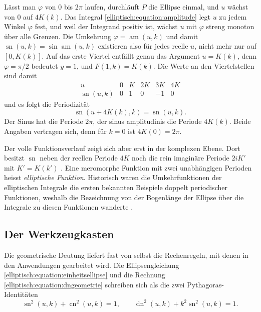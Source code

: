 Lässt man $\varphi$ von $0$ bis $2\pi$ laufen, durchläuft $P$ die
Ellipse einmal, und $u$ wächst von $0$ auf $4K(k)$.
Das Integral \eqref{elliptisch:equation:amplitude} legt $u$ zu
jedem Winkel $\varphi$ fest, und weil der Integrand positiv ist,
wächst $u$ mit $\varphi$ streng monoton über alle Grenzen.
Die Umkehrung $\varphi = \operatorname{am}(u,k)$ und damit
$\operatorname{sn}(u,k) = \sin\operatorname{am}(u,k)$ existieren
also für jedes reelle $u$, nicht mehr nur auf $[0, K(k)]$.
Auf das erste Viertel entfällt genau das Argument $u = K(k)$,
denn $\varphi = \pi/2$ bedeutet $y = 1$, und $F(1,k) = K(k)$.
Die Werte an den Viertelstellen sind damit
\begin{equation}
\begin{array}{c|ccccc}
u & 0 & K & 2K & 3K & 4K\\
\hline
\operatorname{sn}(u,k) & 0 & 1 & 0 & -1 & 0
\end{array}
\label{elliptisch:equation:snviertel}
\end{equation}
und es folgt die Periodizität
\begin{equation}
\operatorname{sn}(u + 4K(k), k)
=
\operatorname{sn}(u,k).
\label{elliptisch:equation:periode}
\end{equation}
Der Sinus hat die Periode $2\pi$, der sinus amplitudinis die
Periode $4K(k)$.
Beide Angaben vertragen sich, denn für $k = 0$ ist
$4K(0) = 2\pi$.
%

Der volle Funktionsverlauf zeigt sich aber erst in der komplexen
Ebene.
Dort besitzt $\operatorname{sn}$ neben der reellen Periode $4K$
noch die rein imaginäre Periode $2iK'$ mit $K' = K(k')$
\cite[Abschnitt~11.1.4, S.~307--308]{elliptisch:mueller-spezielle}.
Eine meromorphe Funktion mit zwei unabhängigen Perioden heisst
\emph{elliptische Funktion}.
Historisch waren die Umkehrfunktionen der elliptischen Integrale
die ersten bekannten Beispiele doppelt periodischer Funktionen,
weshalb die Bezeichnung von der Bogenlänge der Ellipse über die
Integrale zu diesen Funktionen wanderte
\cite{elliptisch:wiki-elliptische-funktion}.
%

\subsection{Der Werkzeugkasten
\label{elliptisch:subsection:werkzeugkasten}}
Die geometrische Deutung liefert fast von selbst die Rechenregeln,
mit denen in den Anwendungen gearbeitet wird.
Die Ellipsengleichung \eqref{elliptisch:equation:einheitsellipse}
und die Rechnung \eqref{elliptisch:equation:dngeometrie} schreiben
sich als die zwei Pythagoras-Identitäten
\begin{equation}
\operatorname{sn}^2(u,k) + \operatorname{cn}^2(u,k) = 1,
\qquad
\operatorname{dn}^2(u,k) + k^2\operatorname{sn}^2(u,k) = 1.
\label{elliptisch:equation:pythagoras}
\end{equation}

